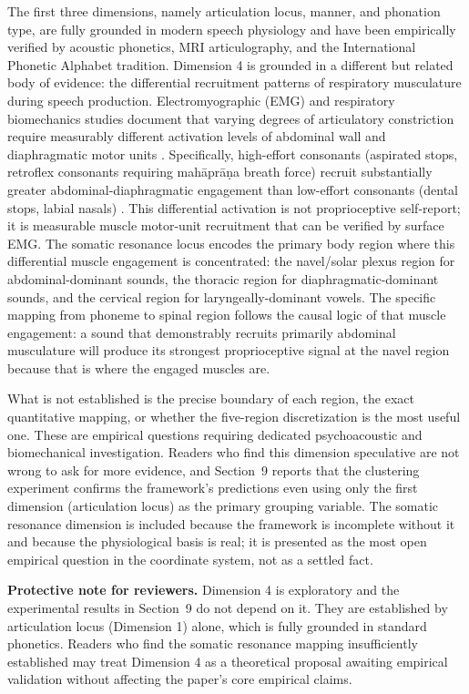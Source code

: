 \documentclass[12pt]{article}
\begin{document}
The first three dimensions, namely articulation locus, manner, and phonation type, are fully grounded in modern speech physiology and have been empirically verified by acoustic phonetics, MRI articulography, and the International Phonetic Alphabet tradition. Dimension 4 is grounded in a different but related body of evidence: the differential recruitment patterns of respiratory musculature during speech production. Electromyographic (EMG) and respiratory biomechanics studies document that varying degrees of articulatory constriction require measurably different activation levels of abdominal wall and diaphragmatic motor units \citep{sundberg1987, zemlin1998}. Specifically, high-effort consonants (aspirated stops, retroflex consonants requiring mahāprāṇa breath force) recruit substantially greater abdominal-diaphragmatic engagement than low-effort consonants (dental stops, labial nasals) \citep{titze1994}. This differential activation is not proprioceptive self-report; it is measurable muscle motor-unit recruitment that can be verified by surface EMG. The somatic resonance locus encodes the primary body region where this differential muscle engagement is concentrated: the navel/solar plexus region for abdominal-dominant sounds, the thoracic region for diaphragmatic-dominant sounds, and the cervical region for laryngeally-dominant vowels. The specific mapping from phoneme to spinal region follows the causal logic of that muscle engagement: a sound that demonstrably recruits primarily abdominal musculature will produce its strongest proprioceptive signal at the navel region because that is where the engaged muscles are.

What is not established is the precise boundary of each region, the exact quantitative mapping, or whether the five-region discretization is the most useful one. These are empirical questions requiring dedicated psychoacoustic and biomechanical investigation. Readers who find this dimension speculative are not wrong to ask for more evidence, and Section~9 reports that the clustering experiment confirms the framework's predictions even using only the first dimension (articulation locus) as the primary grouping variable. The somatic resonance dimension is included because the framework is incomplete without it and because the physiological basis is real; it is presented as the most open empirical question in the coordinate system, not as a settled fact.

\textbf{Protective note for reviewers.} Dimension 4 is exploratory and the experimental results in Section~9 do not depend on it. They are established by articulation locus (Dimension 1) alone, which is fully grounded in standard phonetics. Readers who find the somatic resonance mapping insufficiently established may treat Dimension 4 as a theoretical proposal awaiting empirical validation without affecting the paper's core empirical claims.
\end{document}
